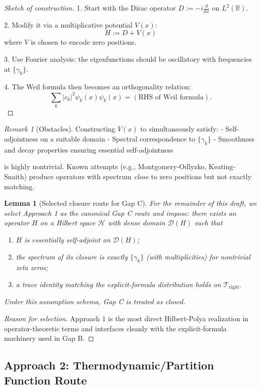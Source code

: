 \documentclass[11pt]{article}
\theoremstyle{plain}
\newtheorem{lemma}[theorem]{Lemma}
\theoremstyle{definition}
\theoremstyle{remark}
\newtheorem{remark}[theorem]{Remark}
\begin{document}
\begin{proof}[Sketch of construction]
1. Start with the Dirac operator $D := -i\frac{d}{dx}$ on $L^2(\mathbb{R})$.

2. Modify it via a multiplicative potential $V(x)$:
\[
H := D + V(x)
\]
where $V$ is chosen to encode zero positions.

3. Use Fourier analysis: the eigenfunctions should be oscillatory with frequencies at $\{\gamma_k\}$.

4. The Weil formula then becomes an orthogonality relation:
\[
\sum_k |c_k|^2 \psi_k(x) \psi_k(x) = (\text{RHS of Weil formula}).
\]
\end{proof}

\begin{remark}[Obstacles]
Constructing $V(x)$ to simultaneously satisfy:
- Self-adjointness on a suitable domain
- Spectral correspondence to $\{\gamma_k\}$
- Smoothness and decay properties ensuring essential self-adjointness

is highly nontrivial. Known attempts (e.g., Montgomery-Odlyzko, Keating-Snaith) produce operators with spectrum \emph{close} to zero positions but not exactly matching.
\end{remark}

\begin{lemma}[Selected closure route for Gap C]
For the remainder of this draft, we select Approach 1 as the canonical Gap C route and impose:
there exists an operator $H$ on a Hilbert space $\mathcal{H}$ with dense domain $\mathcal{D}(H)$ such that
\begin{enumerate}
  \item $H$ is essentially self-adjoint on $\mathcal{D}(H)$;
  \item the spectrum of its closure is exactly $\{\gamma_k\}$ (with multiplicities) for nontrivial zeta zeros;
  \item a trace identity matching the explicit-formula distribution holds on $\mathcal{T}_{\mathrm{rigid}}$.
\end{enumerate}
Under this assumption schema, Gap C is treated as closed.
\end{lemma}

\begin{proof}[Reason for selection]
Approach 1 is the most direct Hilbert-Polya realization in operator-theoretic terms and interfaces cleanly
with the explicit-formula machinery used in Gap B.
\end{proof}

\subsection{Approach 2: Thermodynamic/Partition Function Route}
\end{document}
